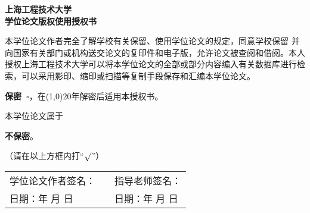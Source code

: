 \newcommand{\checkdone}{\rlap{$\square$}{\raisebox{2pt}{\large\hspace{1pt}\cmark}}\hspace{-2.5pt}}
\newcommand{\checkundone}{$\square$}
\begin{center}
    \heiti\sanhao\textbf{
    上海工程技术大学 \\
    学位论文版权使用授权书}
\end{center}

本学位论文作者完全了解学校有关保留、使用学位论文的规定，同意学校保留
并向国家有关部门或机构送交论文的复印件和电子版，允许论文被查阅和借阅。本人
授权上海工程技术大学可以将本学位论文的全部或部分内容编入有关数据库进行检
索，可以采用影印、缩印或扫描等复制手段保存和汇编本学位论文。

\hspace{8em}\textbf{保密~}\checkundone ，在\line(1,0){20}年解密后适用本授权书。

本学位论文属于

\hspace{8em}\textbf{不保密}\checkdone 。

（请在以上方框内打\quad “\emph{$\surd$}”）

\vspace{15em}
\begin{table}[hbpt]
    \centering
    \renewcommand\arraystretch{1.8}
    \begin{tabular}{p{6cm}<{\raggedright}p{2cm}<{\centering}p{6cm}<{\raggedright}}
        学位论文作者签名：& & 指导老师签名： \\
        日期：\qquad 年 \qquad 月 \qquad 日 & & 日期：\qquad 年 \qquad 月 \qquad 日
    \end{tabular}
\end{table}
\newpage

